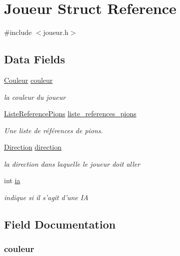 \hypertarget{struct_joueur}{\section{Joueur Struct Reference}
\label{struct_joueur}
}


{\ttfamily \#include $<$joueur.\-h$>$}

\subsection*{Data Fields}
\begin{DoxyCompactItemize}
\item 
\hyperlink{couleur_8h_aa304d0ca681f782b1d7735da33037dd7}{Couleur} \hyperlink{struct_joueur_af0e152d09c13944935e00bef7a3c5111}{couleur}
\begin{DoxyCompactList}\small\item\em la couleur du joueur \end{DoxyCompactList}\item 
\hyperlink{struct_liste_reference_pions}{Liste\-Reference\-Pions} \hyperlink{struct_joueur_adf6743bc36a06d5fb27a8a32974d9db1}{liste\-\_\-references\-\_\-pions}
\begin{DoxyCompactList}\small\item\em Une liste de références de pions. \end{DoxyCompactList}\item 
\hyperlink{direction_8h_a224b9163917ac32fc95a60d8c1eec3aa}{Direction} \hyperlink{struct_joueur_a53421c695d00016ab925777d423b4eb6}{direction}
\begin{DoxyCompactList}\small\item\em la direction dans laquelle le joueur doit aller \end{DoxyCompactList}\item 
int \hyperlink{struct_joueur_a2c924fc0836c91dc1e9f1c4c443f53a9}{ia}
\begin{DoxyCompactList}\small\item\em indique si il s'agit d'une I\-A \end{DoxyCompactList}\end{DoxyCompactItemize}


\subsection{Field Documentation}
\hypertarget{struct_joueur_af0e152d09c13944935e00bef7a3c5111}{
\subsubsection[{couleur}]{ couleur}}\label{struct_joueur_af0e152d09c13944935e00bef7a3c5111}


